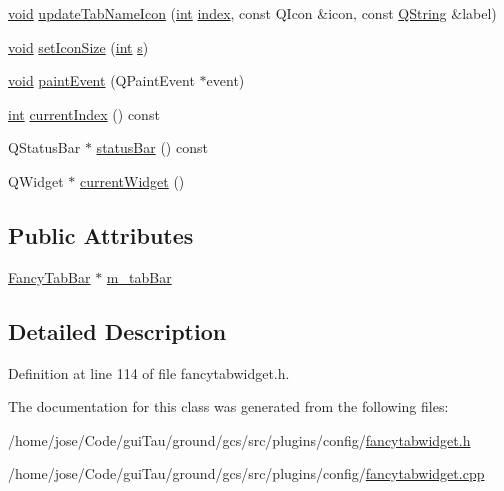 \begin{DoxyCompactItemize}
\item 
\hyperlink{group___u_a_v_objects_plugin_ga444cf2ff3f0ecbe028adce838d373f5c}{void} \hyperlink{group___core_plugin_ga60b5443453a15ccc38967ada38627ea9}{update\-Tab\-Name\-Icon} (\hyperlink{ioapi_8h_a787fa3cf048117ba7123753c1e74fcd6}{int} \hyperlink{glext_8h_ab47dd9958bcadea08866b42bf358e95e}{index}, const Q\-Icon \&icon, const \hyperlink{group___u_a_v_objects_plugin_gab9d252f49c333c94a72f97ce3105a32d}{Q\-String} \&label)
\item 
\hyperlink{group___u_a_v_objects_plugin_ga444cf2ff3f0ecbe028adce838d373f5c}{void} \hyperlink{group___core_plugin_ga41938cf0209d4846794ddea1b3a4b30c}{set\-Icon\-Size} (\hyperlink{ioapi_8h_a787fa3cf048117ba7123753c1e74fcd6}{int} \hyperlink{glext_8h_ad585a1393cfa368fa9dc3d8ebff640d5}{s})
\item 
\hyperlink{group___u_a_v_objects_plugin_ga444cf2ff3f0ecbe028adce838d373f5c}{void} \hyperlink{group___core_plugin_ga7f3bc1d5a3bdac8f7944f9970d2756eb}{paint\-Event} (Q\-Paint\-Event $\ast$event)
\item 
\hyperlink{ioapi_8h_a787fa3cf048117ba7123753c1e74fcd6}{int} \hyperlink{group___core_plugin_ga472485c9f09c372639cad92656a6d73b}{current\-Index} () const 
\item 
Q\-Status\-Bar $\ast$ \hyperlink{group___core_plugin_ga5581f5fbc90b13a3ddbca61c0dba433c}{status\-Bar} () const 
\item 
Q\-Widget $\ast$ \hyperlink{group___core_plugin_ga6a20510df503ecedaf372f0752e7d99b}{current\-Widget} ()
\end{DoxyCompactItemize}
\subsection*{Public Attributes}
\begin{DoxyCompactItemize}
\item 
\hyperlink{class_fancy_tab_bar}{Fancy\-Tab\-Bar} $\ast$ \hyperlink{group___core_plugin_gaae154251a11cba863e66fd9b7363a605}{m\-\_\-tab\-Bar}
\end{DoxyCompactItemize}


\subsection{Detailed Description}


Definition at line 114 of file fancytabwidget.\-h.



The documentation for this class was generated from the following files\-:\begin{DoxyCompactItemize}
\item 
/home/jose/\-Code/gui\-Tau/ground/gcs/src/plugins/config/\hyperlink{config_2fancytabwidget_8h}{fancytabwidget.\-h}\item 
/home/jose/\-Code/gui\-Tau/ground/gcs/src/plugins/config/\hyperlink{config_2fancytabwidget_8cpp}{fancytabwidget.\-cpp}\end{DoxyCompactItemize}

